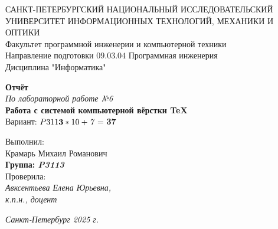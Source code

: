 \begin{titlepage}
    \begin{center}
        {\Large САНКТ-ПЕТЕРБУРГСКИЙ НАЦИОНАЛЬНЫЙ ИССЛЕДОВАТЕЛЬСКИЙ УНИВЕРСИТЕТ ИНФОРМАЦИОННЫХ ТЕХНОЛОГИЙ, МЕХАНИКИ И ОПТИКИ} \\
        \vspace{3mm}
        Факультет программной инженерии и компьютерной техники \\
        \vspace{1mm}
        Направление подготовки $09.03.04$ Программная инженерия \\
        \vspace{1mm}
        Дисциплина "Информатика" \\
        
        \vspace{3cm}

        \textbf{\Large Отчёт} \\
        \textit{По лабораторной работе №6} \\
        \textbf{Работа с системой компьютерной вёрстки \TeX}\\
        Вариант: $P311\space\textbf{3} * 10 + \textit{7}$ = \textbf{37}\\
        
    \end{center}

    \vspace{8mm}
    
    \begin{flushright}
        Выполнил:\\
        \vspace{3mm}
        Крамарь Михаил Романович \\
        \textbf{Группа: \textit{P3113}}\\ 
        \vspace{5mm}
        Проверила:\\
        \vspace{3mm}
        \textit{Авксентьева Елена Юрьевна,\\
        к.п.н., доцент}
    \end{flushright}
    
    \vspace{10mm}
    
    \vspace{\fill}
    
    \begin{center}
        \textit{Санкт-Петербург 2025 г.}
    \end{center}
    
\end{titlepage}
